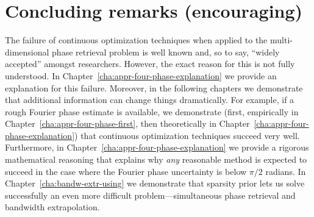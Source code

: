 \section{Concluding remarks (encouraging)}
\label{sec:concl-remarks-enco}
The failure of continuous optimization techniques when applied to the
multi-dimensional phase retrieval problem is well known and, so to
say, ``widely accepted'' amongst researchers. However, the exact
reason for this is not fully understood. In
Chapter~\ref{cha:appr-four-phase-explanation} we provide an
explanation for this failure. Moreover, in the following chapters we
demonstrate that additional information can change things
dramatically. For example, if a rough Fourier phase estimate is
available, we demonstrate (first, empirically in
Chapter~\ref{cha:appr-four-phase-first}, then theoretically in
Chapter~\ref{cha:appr-four-phase-explanation}) that continuous
optimization techniques succeed very well. Furthermore, in
Chapter~\ref{cha:appr-four-phase-explanation} we provide a rigorous
mathematical reasoning that explains why \textit{any} reasonable
method is expected to succeed in the case where the Fourier phase
uncertainty is below $\pi/2$ radians. In
Chapter~\ref{cha:bandw-extr-using} we demonstrate that sparsity prior
lets us solve successfully an even more difficult
problem---simultaneous phase retrieval and bandwidth extrapolation.


